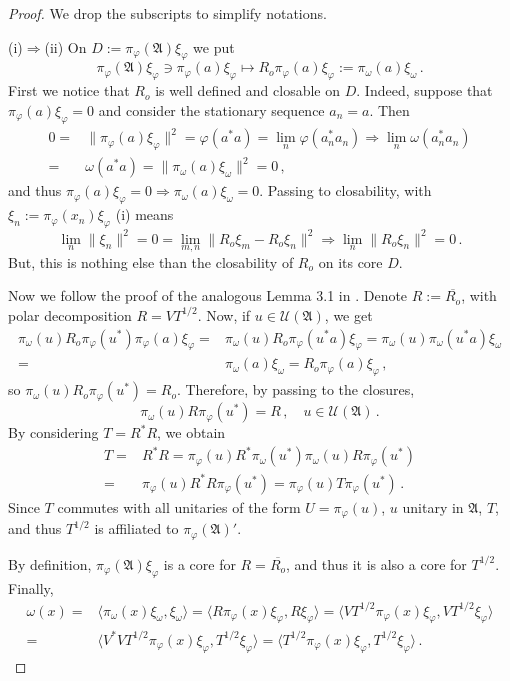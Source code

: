 \documentclass[12pt]{amsart}
\numberwithin{equation}{section}
\def\cu{{\mathcal U}}
\def\ga{{\mathfrak A}} \def\gpa{{\mathfrak a}}
\def\f{\varphi}\def\ff{\phi} \def\F{\Phi}
\def\om{\omega} \def\Om{\Omega}
\begin{document}
\begin{proof}
We drop the subscripts to simplify notations.

(i)$\Rightarrow$(ii) On $D:=\pi_\f(\ga)\xi_\f$ we put
$$
\pi_\f(\ga)\xi_\f\ni\pi_\f(a)\xi_\f\mapsto R_o\pi_\f(a)\xi_\f:=\pi_\om(a)\xi_\om\,.
$$
First we notice that $R_o$ is well defined and closable on $D$. 
Indeed, suppose that $\pi_\f(a)\xi_\f=0$ and consider the stationary sequence $a_n=a$. Then
\begin{align*}
0=&\|\pi_\f(a)\xi_\f\|^2=\f(a^*a)=\lim_n\f(a_n^*a_n)\Rightarrow\lim_n\om(a_n^*a_n)\\
=&\om(a^*a)=\|\pi_\om(a)\xi_\om\|^2=0\,,
\end{align*}
and thus $\pi_\f(a)\xi_\f=0\Rightarrow\pi_\om(a)\xi_\om=0$.
Passing to closability, with $\xi_n:=\pi_\f(x_n)\xi_\f$ (i) means
$$
\lim_n\|\xi_n\|^2=0=\lim_{m,n}\|R_o\xi_m-R_o\xi_n\|^2\Rightarrow\lim_n\|R_o\xi_n\|^2=0\,.
$$
But, this is nothing else than the closability of $R_o$ on its core $D$.

Now we follow the proof of the analogous Lemma 3.1 in \cite{Hi}. Denote $R:=\overline{R_o}$, with polar decomposition $R=VT^{1/2}$. Now, if $u\in\mathcal U(\ga)$, we get
\begin{align*}
\pi_\om(u)R_o\pi_\f(u^*)\pi_\f(a)\xi_\f=&\pi_\om(u)R_o\pi_\f(u^*a)\xi_\f=\pi_\om(u)\pi_\om(u^*a)\xi_\om\\
=&\pi_\om(a)\xi_\om=R_o\pi_\f(a)\xi_\f\,,
\end{align*}
so $\pi_\om(u)R_o\pi_\f(u^*)=R_o$.
Therefore, by passing to the closures, 
$$
\pi_\om(u)R\pi_\f(u^*)=R\,,\quad u\in\cu(\ga)\,.
$$
By considering $T=R^*R$, we obtain
\begin{align*}
T=&R^*R=\pi_\f(u)R^*\pi_\om(u^*)\pi_\om(u)R\pi_\f(u^*)\\
=&\pi_\f(u)R^*R\pi_\f(u^*)=\pi_\f(u)T\pi_\f(u^*)\,.
\end{align*}
Since $T$ commutes with all unitaries of the form $U=\pi_\f(u)$, $u$ unitary in $\ga$, $T$, and thus $T^{1/2}$ is affiliated to $\pi_\f(\ga)'$.

By definition, $\pi_\f(\ga)\xi_\f$ is a core for $R=\overline{R_o}$, and thus it is also a core for $T^{1/2}$. Finally,
\begin{align*}
\om(x)=&\langle\pi_\om(x)\xi_\om,\xi_\om\rangle=\langle R\pi_\f(x)\xi_\f,R\xi_\f\rangle=\langle VT^{1/2}\pi_\f(x)\xi_\f,VT^{1/2}\xi_\f\rangle\\
=&\langle V^*VT^{1/2}\pi_\f(x)\xi_\f,T^{1/2}\xi_\f\rangle=\langle T^{1/2}\pi_\f(x)\xi_\f,T^{1/2}\xi_\f\big\rangle\,.
\end{align*}


\end{proof}
\end{document}
